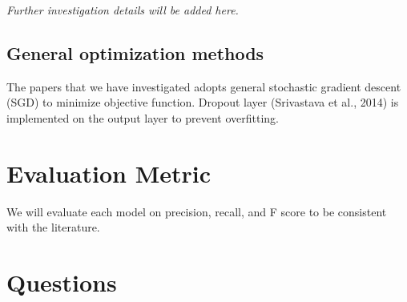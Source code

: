 \documentclass{article}
\begin{document}
	\textit{Further investigation details will be added here.} \\

\subsection{General optimization methods}
	The papers that we have investigated adopts general stochastic gradient descent (SGD) to minimize objective function.
	Dropout layer (Srivastava et al., 2014) is implemented on the output layer to prevent overfitting.

\section{Evaluation Metric}
	We will evaluate each model on precision, recall, and F score to be consistent with the literature.
  
\section{Questions}


\medskip




\small
\end{document}
